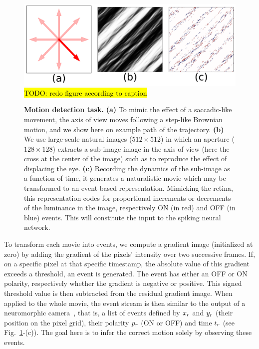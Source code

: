 \documentclass[default]{sn-jnl}%
\theoremstyle{thmstyleone}%
\theoremstyle{thmstyletwo}%
\theoremstyle{thmstylethree}%
\newcommand{\seeFig}[1]{see Fig.~\ref{fig:#1}}%
\DeclareRobustCommand{\note}[1]{{\sethlcolor{yellow}\hl{#1}}}
\begin{document}
\begin{figure}[h!]%
    \centering
    \includegraphics[width=0.95\linewidth]{figures/motionclouds.pdf}
    \note{TODO: redo figure according to caption}
    \caption{
    {\bf Motion detection task.} {\bf (a)} To mimic the effect of a saccadic-like movement, the axis of view moves following a step-like Brownian motion, and we show here on example path of the trajectory. {\bf (b)} We use large-scale natural images ($512\times512$) in which an aperture ($128\times128$) extracts a sub-image image in the axis of view (here the cross at the center of the image) such as to reproduce the effect of displacing the eye. {\bf (c)} Recording the dynamics of the sub-image as a function of time, it generates a naturalistic movie which may be transformed to an event-based representation. Mimicking the retina, this representation codes for proportional increments or decrements of the luminance in the image, respectively ON (in red) and OFF (in blue) events. This will constitute the input to the spiking neural network.}
    \label{fig:motionclouds}
\end{figure}


To transform each movie into events, we compute a gradient image (initialized at zero) by adding the gradient of the pixels' intensity over two successive frames. If, on a specific pixel at that specific timestamp, the absolute value of this gradient exceeds a threshold, an event is generated. The event has either an OFF or ON polarity, respectively whether the gradient is negative or positive. This signed threshold value is then subtracted from the residual gradient image. When applied to the whole movie, the event stream is then similar to the output of a neuromorphic camera~\citep{rasetto_challenges_2022}, that is, a list of events defined by $x_r$ and $y_r$ (their position on the pixel grid), their polarity $p_r$ (ON or OFF) and time $t_r$  (\seeFig{motionclouds}-(c)). The goal here is to infer the correct motion solely by observing these events.
\end{document}
